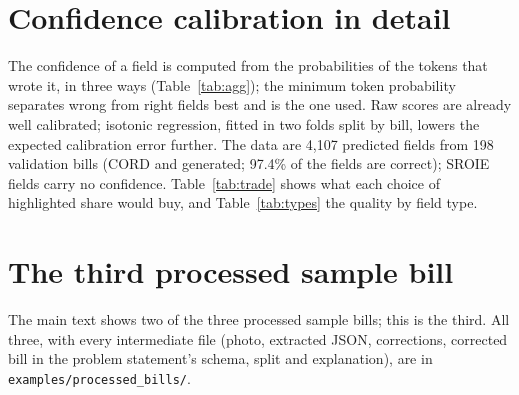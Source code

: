 \section{Confidence calibration in detail}\label{app:cal}
The confidence of a field is computed from the probabilities of the tokens that wrote it, in three ways (Table~\ref{tab:agg}); the minimum token probability separates wrong from right fields best and is the one used. Raw scores are already well calibrated; isotonic regression, fitted in two folds split by bill, lowers the expected calibration error further. The data are 4,107 predicted fields from 198 validation bills (CORD and generated; 97.4\% of the fields are correct); SROIE fields carry no confidence. Table~\ref{tab:trade} shows what each choice of highlighted share would buy, and Table~\ref{tab:types} the quality by field type.

\begin{table}[!ht]\centering\footnotesize\setlength{\tabcolsep}{3.5pt}

\caption{Three ways to score a field. ECE is expected calibration error.}\label{tab:agg}
\end{table}
\begin{table}[!ht]\centering\footnotesize

\caption{Trade-off for the highlighting threshold (minimum-token score).}\label{tab:trade}
\end{table}
\begin{table}[!ht]\centering\footnotesize

\caption{Confidence quality by field type. Quantity is the field the score can least separate.}\label{tab:types}
\end{table}

\section{The third processed sample bill}\label{app:bill3}
The main text shows two of the three processed sample bills; this is the third. All three, with every intermediate file (photo, extracted JSON, corrections, corrected bill in the problem statement's schema, split and explanation), are in \texttt{examples/processed\_bills/}.



